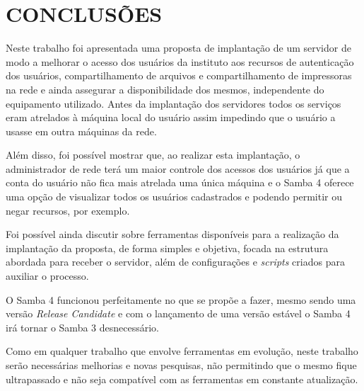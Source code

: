 \chapter{CONCLUSÕES}

Neste trabalho foi apresentada uma proposta de implantação de um servidor de modo a melhorar o acesso dos usuários da instituto aos recursos de autenticação dos usuários, compartilhamento de arquivos e compartilhamento de impressoras na rede e ainda assegurar a disponibilidade dos mesmos, independente do equipamento utilizado. Antes da implantação dos servidores todos os serviços eram atrelados à máquina local do usuário assim impedindo que o usuário a usasse em outra máquinas da rede.

Além disso, foi possível mostrar que, ao realizar esta implantação, o administrador de rede terá um maior controle dos acessos dos usuários já que a conta do usuário não fica mais atrelada uma única máquina e o Samba 4 oferece uma opção de visualizar todos os usuários cadastrados e podendo permitir ou negar recursos, por exemplo.

Foi possível ainda discutir sobre ferramentas disponíveis para a realização da implantação da proposta, de forma simples e objetiva, focada na estrutura abordada para receber o servidor, além de configurações e \textit{scripts} criados para auxiliar o processo.


O Samba 4 funcionou perfeitamente no que se propõe a fazer, mesmo sendo uma versão \textit{Release Candidate} e com o lançamento de uma versão estável o Samba 4 irá tornar o Samba 3 desnecessário.

Como em qualquer trabalho que envolve ferramentas em evolução, neste trabalho serão necessárias melhorias e novas pesquisas, não permitindo que o mesmo fique ultrapassado e não seja compatível com as ferramentas em constante atualização.




